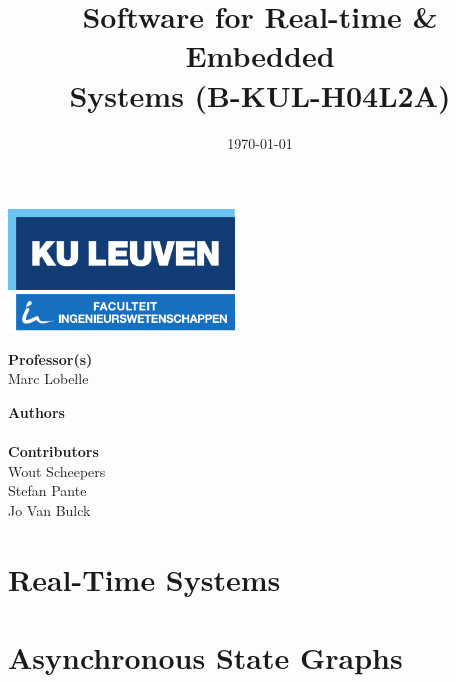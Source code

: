 \documentclass[11pt,a4paper]{book}
\title{Software for Real-time \& Embedded \\ Systems (B-KUL-H04L2A)}
\date{\today}
\author{\theauthors}
\newcommand{\thecontributors}{Wout Scheepers \\ Stefan Pante \\ Jo Van Bulck}
\newcommand{\theprofs}{Marc Lobelle}
\theoremstyle{definition}
\begin{document}
\frontmatter

\begin{titlepage}
\thispagestyle{empty}

\begin{minipage}{\textwidth}
	\includegraphics[width=60mm]{logokuleng.pdf}
\end{minipage}

\vspace{40mm}

\begin{minipage}{\textwidth}
	\Huge
	\sffamily
	\thetitle
\end{minipage}

\vspace{50mm}

\hfill
\begin{minipage}[t]{0.5\textwidth}
	\Large
	\sffamily
	\textbf{Professor(s)} \\
	\theprofs
\end{minipage}%
\begin{minipage}[t]{0.5\textwidth}
\begin{flushright}
	\Large
	\sffamily
	\textbf{Authors} \\
	\theauthor
	\vspace{10mm} \\
	\textbf{Contributors} \\
	\thecontributors
\end{flushright}
\end{minipage}
\vfill
\end{titlepage}

\tableofcontents

\newpage


\mainmatter
\part{Real-Time Systems}





\part{Asynchronous State Graphs}



\appendix

\backmatter

\printindex



\nocite{*}
\end{document}

